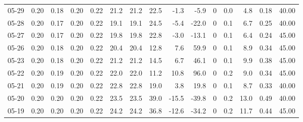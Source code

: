 \begin{threeparttable}
{\begin{tabular}{lrrrrrrrrrrrrrr}
  05-29 &          0.20 &          0.18 &          0.20 &        0.22 &                21.2 &               21.2 &                22.5 &       -1.3 &         -5.9 &              0 &                 0.0 &              4.8 &            0.18 &                  40.00 \\
  05-28 &          0.20 &          0.17 &          0.20 &        0.22 &                19.1 &               19.1 &                24.5 &       -5.4 &        -22.0 &              0 &                 0.1 &              6.7 &            0.25 &                  40.00 \\
  05-27 &          0.20 &          0.17 &          0.20 &        0.22 &                19.8 &               19.8 &                22.8 &       -3.0 &        -13.1 &              0 &                 0.1 &              6.4 &            0.24 &                  45.00 \\
  05-26 &          0.20 &          0.18 &          0.20 &        0.22 &                20.4 &               20.4 &                12.8 &        7.6 &         59.9 &              0 &                 0.1 &              8.9 &            0.34 &                  45.00 \\
  05-23 &          0.20 &          0.18 &          0.20 &        0.22 &                21.2 &               21.2 &                14.5 &        6.7 &         46.1 &              0 &                 0.1 &              9.9 &            0.38 &                  45.00 \\
  05-22 &          0.20 &          0.19 &          0.20 &        0.22 &                22.0 &               22.0 &                11.2 &       10.8 &         96.0 &              0 &                 0.2 &              9.0 &            0.34 &                  45.00 \\
  05-21 &          0.20 &          0.19 &          0.20 &        0.22 &                22.8 &               22.8 &                19.0 &        3.8 &         19.8 &              0 &                 0.1 &              8.7 &            0.33 &                  40.00 \\
  05-20 &          0.20 &          0.20 &          0.20 &        0.22 &                23.5 &               23.5 &                39.0 &      -15.5 &        -39.8 &              0 &                 0.2 &             13.0 &            0.49 &                  40.00 \\
  05-19 &          0.20 &          0.20 &          0.20 &        0.22 &                24.2 &               24.2 &                36.8 &      -12.6 &        -34.2 &              0 &                 0.2 &             11.7 &            0.44 &                  45.00 \\

\end{tabular}}
\end{threeparttable}
